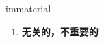 
\begin{frame}
{\huge immaterial}
\begin{center}
\begin{enumerate}\Large
  \item \textbf{无关的，不重要的}
\end{enumerate}
\end{center}
\end{frame}
